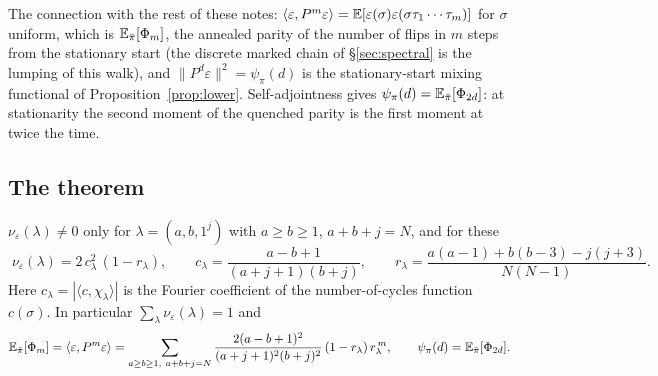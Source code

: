 The connection with the rest of these notes: $\langle\varepsilon,P^m\varepsilon\rangle
=\mathbb{E}[\varepsilon(\sigma)\varepsilon(\sigma\tau_1\cdots\tau_m)]$ for
$\sigma$ uniform, which is $\mathbb{E}_{\bar\pi}[\Phi_m]$, the annealed parity of
the number of flips in $m$ steps from the stationary start (the
discrete marked chain of \S\ref{sec:spectral} is the lumping of this
walk), and $\|P^d\varepsilon\|^2=\psi_\pi(d)$ is the stationary-start
mixing functional of Proposition~\ref{prop:lower}.  Self-adjointness
gives $\psi_\pi(d)=\mathbb{E}_{\bar\pi}[\Phi_{2d}]$: at stationarity the second
moment of the quenched parity is the first moment at twice the time.

\subsection{The theorem}

\begin{theorem}\label{thm:spectral}
$\nu_\varepsilon(\lambda)\ne0$ only for $\lambda=(a,b,1^j)$ with
$a\ge b\ge1$, $a+b+j=N$, and for these
\[
\boxed{\;
\nu_\varepsilon(\lambda)=2\,c_\lambda^2\,(1-r_\lambda),\qquad
c_\lambda=\frac{a-b+1}{(a+j+1)(b+j)},\qquad
r_\lambda=\frac{a(a-1)+b(b-3)-j(j+3)}{N(N-1)} .\;}
\]
Here $c_\lambda=|\langle c,\chi_\lambda\rangle|$ is the Fourier
coefficient of the number-of-cycles function $c(\sigma)$.  In
particular $\sum_\lambda\nu_\varepsilon(\lambda)=1$ and
\[
\mathbb{E}_{\bar\pi}[\Phi_m]=\langle\varepsilon,P^m\varepsilon\rangle
=\sum_{a\ge b\ge1,\ a+b+j=N}
\frac{2(a-b+1)^2}{(a+j+1)^2(b+j)^2}\,(1-r_\lambda)\,r_\lambda^{\,m},
\qquad
\psi_\pi(d)=\mathbb{E}_{\bar\pi}[\Phi_{2d}] .
\]
\end{theorem}

